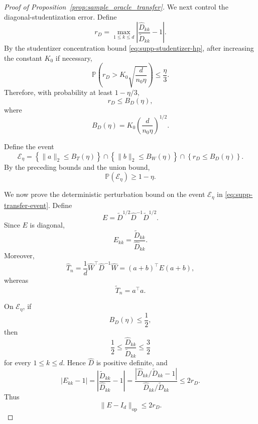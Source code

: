 \documentclass[
  12pt]{article}
\theoremstyle{plain}
\theoremstyle{definition}
\theoremstyle{remark}
\begin{document}
\begin{proof}[Proof of Proposition~\ref{prop:sample_oracle_transfer}]
We next control the diagonal-studentization error. Define
\[
r_D
=
\max_{1\le k\le d}
\left|
\frac{\widehat D_{kk}}{\widetilde D_{kk}}-1
\right|.
\]
By the studentizer concentration bound \eqref{eq:supp-studentizer-hp}, after
increasing the constant \(K_0\) if necessary,
\[
\mathbb P
\left(
r_D>
K_0\sqrt{\frac{d}{n_0\eta}}
\right)
\le
\frac{\eta}{3}.
\]
Therefore, with probability at least \(1-\eta/3\),
\[
r_D\le B_D(\eta),
\]
where
\[
B_D(\eta)=K_0\left(\frac{d}{n_0\eta}\right)^{1/2}.
\]

Define the event
\begin{equation}
\label{eq:supp-transfer-event}
\mathcal E_\eta
=
\left\{
\|a\|_2\le B_T(\eta)
\right\}
\cap
\left\{
\|b\|_2\le B_W(\eta)
\right\}
\cap
\left\{
r_D\le B_D(\eta)
\right\}.
\end{equation}
By the preceding bounds and the union bound,
\begin{equation}
\label{eq:supp-transfer-event-prob}
\mathbb P(\mathcal E_\eta)\ge 1-\eta.
\end{equation}

We now prove the deterministic perturbation bound on the event
\(\mathcal E_\eta\) in \eqref{eq:supp-transfer-event}.
Define
\[
E
=
\widetilde D^{1/2}\widehat D^{-1}\widetilde D^{1/2}.
\]
Since \(E\) is diagonal,
\[
E_{kk}
=
\frac{\widetilde D_{kk}}{\widehat D_{kk}}.
\]
Moreover,
\[
\widehat T_n
=
\frac1d\widehat W^\top\widehat D^{-1}\widehat W
=
(a+b)^\top E(a+b),
\]
whereas
\[
\widetilde T_n=a^\top a.
\]

On \(\mathcal E_\eta\), if
\[
B_D(\eta)\le \frac12,
\]
then
\[
\frac12
\le
\frac{\widehat D_{kk}}{\widetilde D_{kk}}
\le
\frac32
\]
for every \(1\le k\le d\). Hence \(\widehat D\) is positive definite, and
\[
|E_{kk}-1|
=
\left|
\frac{\widetilde D_{kk}}{\widehat D_{kk}}-1
\right|
=
\frac{
\left|
\widehat D_{kk}/\widetilde D_{kk}-1
\right|
}{
\widehat D_{kk}/\widetilde D_{kk}
}
\le
2r_D.
\]
Thus
\[
\|E-I_d\|_{\mathrm{op}}\le 2r_D.
\]


\end{proof}
\end{document}
